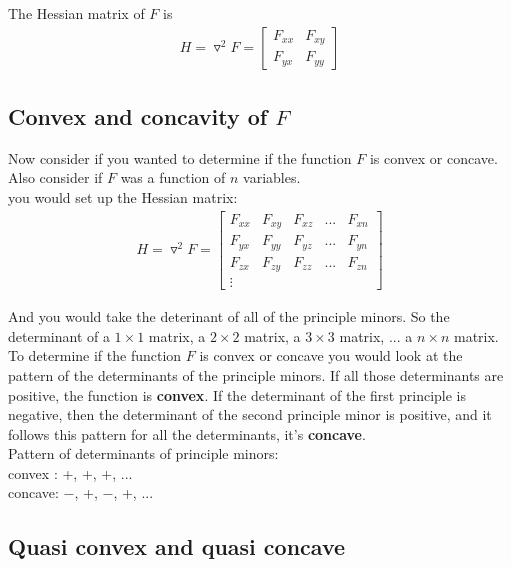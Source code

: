 \documentclass{article}
\begin{document}
The Hessian matrix of $F$ is 
\begin{align}
    H = \triangledown^2 F = \begin{bmatrix}
        F_{xx} &  F_{xy} \\
        F_{yx} & F_{yy}
    \end{bmatrix}
\end{align}

\subsection{Convex and concavity of $F$}
Now consider if you wanted to determine if the function $F$ is convex or concave. Also consider if $F$ was a function of $n$ variables. \\

you would set up the Hessian matrix: 
\begin{align}
    H = \triangledown^2 F = \begin{bmatrix}
        F_{xx} &  F_{xy} & F_{xz} & ... & F_{xn} \\
        F_{yx} & F_{yy} &F_{yz} & ... & F_{yn}\\
        F_{zx} & F_{zy} &F_{zz} & ... & F_{zn}\\
        \vdots & & & & 
    \end{bmatrix}
\end{align}

And you would take the deterinant of all of the principle minors. So the determinant of a $1 \times 1$ matrix, a $2 \times 2$ matrix, a $3 \times 3$ matrix, ... a $n \times n$ matrix. \\

To determine if the function $F$ is convex or concave you would look at the pattern of the determinants of the principle minors. If all those determinants are positive, the function is \textbf{convex}. If the determinant of the first principle is negative, then the determinant of the second principle minor is positive, and it follows this pattern for all the determinants, it's \textbf{concave}. \\

Pattern of determinants of principle minors:\\
convex : +, +, +, ...\\
concave: $-$, +, $-$, +, ...

\subsection{Quasi convex and quasi concave}
\end{document}
